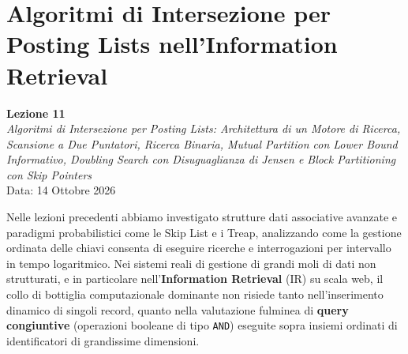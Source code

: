 \chapter{Algoritmi di Intersezione per Posting Lists nell'Information Retrieval}
\label{chap:posting-lists-intersection}

\begin{center}
  \textbf{Lezione 11}\\
  \emph{Algoritmi di Intersezione per Posting Lists: Architettura di un Motore di Ricerca, Scansione a Due Puntatori, Ricerca Binaria, Mutual Partition con Lower Bound Informativo, Doubling Search con Disuguaglianza di Jensen e Block Partitioning con Skip Pointers}\\[0.5em]
  Data: 14 Ottobre 2026
\end{center}

Nelle lezioni precedenti abbiamo investigato strutture dati associative avanzate e paradigmi probabilistici come le Skip List e i Treap, analizzando come la gestione ordinata delle chiavi consenta di eseguire ricerche e interrogazioni per intervallo in tempo logaritmico. Nei sistemi reali di gestione di grandi moli di dati non strutturati, e in particolare nell'\textbf{Information Retrieval} (IR) su scala web, il collo di bottiglia computazionale dominante non risiede tanto nell'inserimento dinamico di singoli record, quanto nella valutazione fulminea di \textbf{query congiuntive} (operazioni booleane di tipo \texttt{AND}) eseguite sopra insiemi ordinati di identificatori di grandissime dimensioni.

